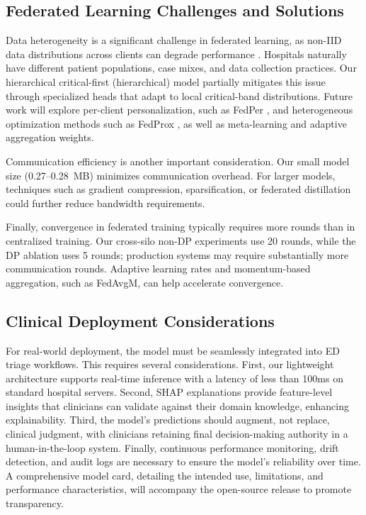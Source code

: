 \documentclass[journal,article,submit,pdftex,moreauthors]{Definitions/mdpi}
\begin{document}
\subsection{Federated Learning Challenges and Solutions}

Data heterogeneity is a significant challenge in federated learning, as non-IID data distributions across clients can degrade performance \cite{hsu2019measuring}. Hospitals naturally have different patient populations, case mixes, and data collection practices. Our hierarchical critical-first (hierarchical) model partially mitigates this issue through specialized heads that adapt to local critical-band distributions. Future work will explore per-client personalization, such as FedPer \cite{arivazhagan2019}, and heterogeneous optimization methods such as FedProx \cite{li2020fedprox}, as well as meta-learning and adaptive aggregation weights.

Communication efficiency is another important consideration. Our small model size (0.27--0.28~MB) minimizes communication overhead. For larger models, techniques such as gradient compression, sparsification, or federated distillation could further reduce bandwidth requirements.

Finally, convergence in federated training typically requires more rounds than in centralized training. Our cross-silo non-DP experiments use 20 rounds, while the DP ablation uses 5 rounds; production systems may require substantially more communication rounds. Adaptive learning rates and momentum-based aggregation, such as FedAvgM, can help accelerate convergence.

\subsection{Clinical Deployment Considerations}

For real-world deployment, the model must be seamlessly integrated into ED triage workflows. This requires several considerations. First, our lightweight architecture supports real-time inference with a latency of less than 100ms on standard hospital servers. Second, SHAP explanations provide feature-level insights that clinicians can validate against their domain knowledge, enhancing explainability. Third, the model's predictions should augment, not replace, clinical judgment, with clinicians retaining final decision-making authority in a human-in-the-loop system. Finally, continuous performance monitoring, drift detection, and audit logs are necessary to ensure the model's reliability over time. A comprehensive model card, detailing the intended use, limitations, and performance characteristics, will accompany the open-source release to promote transparency.
\end{document}

